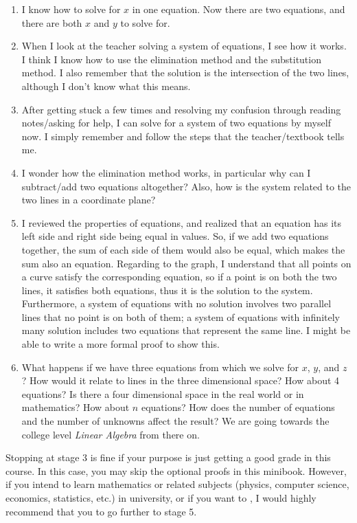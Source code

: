 \documentclass[
]{book}
\providecommand{\tightlist}{%
  \setlength{\itemsep}{0pt}\setlength{\parskip}{0pt}}
\theoremstyle{definition}
\theoremstyle{definition}
\theoremstyle{definition}
\theoremstyle{definition}
\theoremstyle{remark}
\begin{document}
\begin{enumerate}
\def\labelenumi{\arabic{enumi}.}
\tightlist
\item
  I know how to solve for \(x\) in one equation. Now there are two equations, and there are both \(x\) and \(y\) to solve for.
\item
  When I look at the teacher solving a system of equations, I see how it works. I think I know how to use the elimination method and the substitution method. I also remember that the solution is the intersection of the two lines, although I don't know what this means.
\item
  After getting stuck a few times and resolving my confusion through reading notes/asking for help, I can solve for a system of two equations by myself now. I simply remember and follow the steps that the teacher/textbook tells me.
\item
  I wonder how the elimination method works, in particular why can I subtract/add two equations altogether? Also, how is the system related to the two lines in a coordinate plane?
\item
  I reviewed the properties of equations, and realized that an equation has its left side and right side being equal in values. So, if we add two equations together, the sum of each side of them would also be equal, which makes the sum also an equation. Regarding to the graph, I understand that all points on a curve satisfy the corresponding equation, so if a point is on both the two lines, it satisfies both equations, thus it is the solution to the system. Furthermore, a system of equations with no solution involves two parallel lines that no point is on both of them; a system of equations with infinitely many solution includes two equations that represent the same line. I might be able to write a more formal proof to show this.
\item
  What happens if we have three equations from which we solve for \(x\), \(y\), and \(z\)? How would it relate to lines in the three dimensional space? How about 4 equations? Is there a four dimensional space in the real world or in mathematics? How about \(n\) equations? How does the number of equations and the number of unknowns affect the result? We are going towards the college level \emph{Linear Algebra} from there on.
\end{enumerate}

Stopping at stage 3 is fine if your purpose is just getting a good grade in this course. In this case, you may skip the optional proofs in this minibook. However, if you intend to learn mathematics or related subjects (physics, computer science, economics, statistics, etc.) in university, or if you want to , I would highly recommend that you to go further to stage 5.
\end{document}
